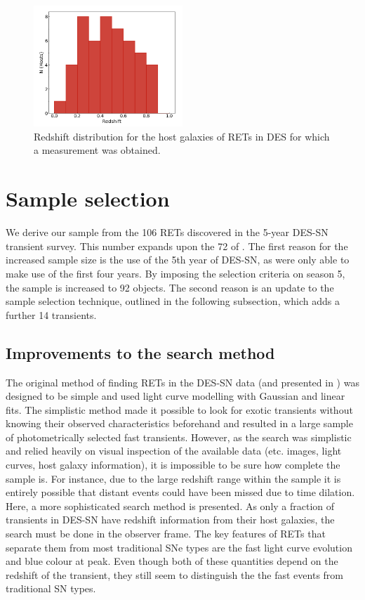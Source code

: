 \documentclass[fleqn,usenatbib,]{mnras}
\begin{document}
\begin{figure}
\includegraphics[width=0.5\textwidth]{figs/z_dist.png}
\caption{Redshift distribution for the host galaxies of RETs in DES for which a measurement was obtained.
\label{fig:z_dist}}
\end{figure}

\section{Sample selection}
\label{sec:sample}
We derive our sample from the 106 RETs discovered in the 5-year DES-SN transient survey. This number expands upon the 72 of . The first reason for the increased sample size is the use of the 5th year of DES-SN, as  were only able to make use of the first four years. By imposing the  selection criteria on season 5, the sample is increased to 92 objects. The second reason is an update to the sample selection technique, outlined in the following subsection, which adds a further 14 transients.

\subsection{Improvements to the search method \label{subsec:new_method}}

The original method of finding RETs in the DES-SN data (and presented in ) was designed to be simple and used light curve modelling with Gaussian and linear fits. The simplistic method made it possible to look for exotic transients without knowing their observed characteristics beforehand and resulted in a large sample of photometrically selected fast transients. However, as the search was simplistic and relied heavily on visual inspection of the available data (etc. images, light curves, host galaxy information), it is impossible to be sure how complete the sample is. For instance, due to the large redshift range within the sample it is entirely possible that distant events could have been missed due to time dilation. Here, a more sophisticated search method is presented. As only a fraction of transients in DES-SN have redshift information from their host galaxies, the search must be done in the observer frame.  The key features of RETs that separate them from most traditional SNe types are the fast light curve evolution and blue colour at peak. Even though both of these quantities depend on the redshift of the transient, they still seem to distinguish the the fast events from traditional SN types. 
\end{document}
